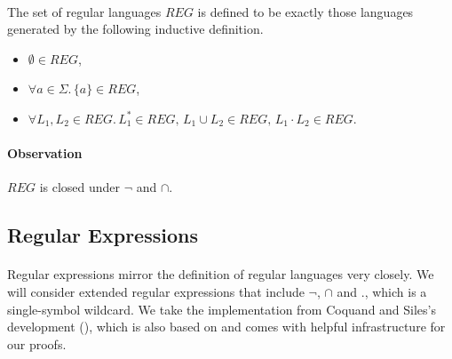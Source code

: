 \documentclass[11pt,a4paper,oneside]{book}
\begin{document}
    
            \paragraph{}
            The set of regular languages $REG$ is defined to be exactly those languages generated by the following inductive definition.
            \begin{itemize}
                \item
                    $\emptyset \in REG$, 
                \item
                    $\forall a \in \Sigma. \, \{a\} \in REG$, 
                \item
                    $\forall L_1, L_2 \in REG. \, L_1^* \in REG, \, L_1 \cup L_2 \in REG, \, L_1 \cdot L_2 \in REG$.
            \end{itemize}

            \paragraph{Observation} $REG$ is closed under $\neg$ and $\cap$. 


        \subsection{Regular Expressions}

                \paragraph{} 
                Regular expressions mirror the definition of regular languages very closely. We will consider extended regular expressions that include $\neg$, $\cap$ and $.$, which is a single-symbol wildcard. 
                We take the implementation from Coquand and Siles's development (\cite{DBLP:conf/cpp/CoquandS11}), which is also based on \ssreflect and comes with helpful infrastructure for our proofs.
\end{document}
